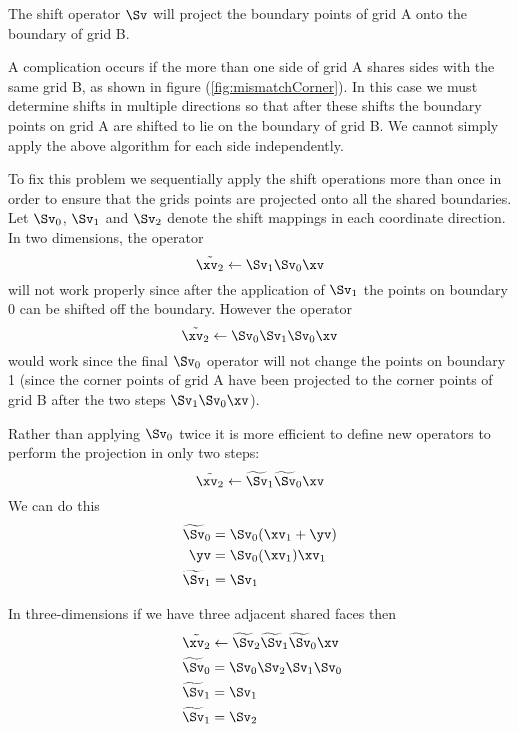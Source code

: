 The shift operator $\Sv$ will project the boundary points of grid A onto the boundary of grid B.

A complication occurs if the more than one side of grid A shares sides with the same grid B, as shown
in figure (\ref{fig:mismatchCorner}). In this case we must determine shifts in multiple directions so that after
these shifts the boundary points on grid A are shifted to lie on the boundary of grid B. We cannot simply 
apply the above algorithm for each side independently.

To fix this problem we sequentially apply the shift operations more than once in order to ensure that
the grids points are projected onto all the shared boundaries. Let $\Sv_0$, $\Sv_1$ and $\Sv_2$
denote the shift mappings in each coordinate direction. In two dimensions, the operator
\[
   \tilde{\xv_2} \leftarrow \Sv_1 \Sv_0 \xv
\]
will not work properly since after the application of $\Sv_1$ the points on boundary 0 can be shifted
off the boundary. However the operator
\[
   \tilde{\xv_2} \leftarrow \Sv_0 \Sv_1 \Sv_0 \xv
\]
would work since the final $\Sv_0$ operator will not change the points on boundary 1 (since the corner
points of grid A have been projected to the corner points of grid B after the two steps $\Sv_1 \Sv_0 \xv$).

Rather than applying $\Sv_0$ twice it is more efficient to define new operators to perform the projection
in only two steps:
\[
   \tilde{\xv_2} \leftarrow \widetilde{\Sv}_1 \widetilde{\Sv}_0 \xv 
\]
We can do this 
\begin{align*}
    \widetilde{\Sv}_0 & =   \Sv_0(\xv_1+\yv) \\
                 \yv  &= \Sv_0(\xv_1)\xv_1 \\
    \widetilde{\Sv}_1 & =   \Sv_1 
\end{align*}

In three-dimensions if we have three adjacent shared faces then 
\begin{align*}
   \tilde{\xv_2} & \leftarrow \widetilde{\Sv}_2 \widetilde{\Sv}_1 \widetilde{\Sv}_0 \xv \\\
    \widetilde{\Sv}_0 & =   \Sv_0 \Sv_2 \Sv_1 \Sv_0 \\
    \widetilde{\Sv}_1 & =   \Sv_1    \\
    \widetilde{\Sv}_1 & =   \Sv_2 
\end{align*}


